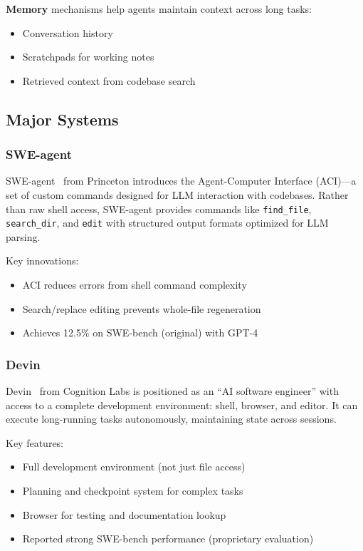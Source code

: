\textbf{Memory} mechanisms help agents maintain context across long tasks:
\begin{itemize}
    \item Conversation history
    \item Scratchpads for working notes
    \item Retrieved context from codebase search
\end{itemize}

\subsection{Major Systems}

\subsubsection{SWE-agent}

SWE-agent~\citep{yang2024sweagent} from Princeton introduces the Agent-Computer Interface (ACI)---a set of custom commands designed for LLM interaction with codebases. Rather than raw shell access, SWE-agent provides commands like \texttt{find\_file}, \texttt{search\_dir}, and \texttt{edit} with structured output formats optimized for LLM parsing.

Key innovations:
\begin{itemize}
    \item ACI reduces errors from shell command complexity
    \item Search/replace editing prevents whole-file regeneration
    \item Achieves 12.5\% on SWE-bench (original) with GPT-4
\end{itemize}

\subsubsection{Devin}

Devin~\citep{cognition2024devin} from Cognition Labs is positioned as an ``AI software engineer'' with access to a complete development environment: shell, browser, and editor. It can execute long-running tasks autonomously, maintaining state across sessions.

Key features:
\begin{itemize}
    \item Full development environment (not just file access)
    \item Planning and checkpoint system for complex tasks
    \item Browser for testing and documentation lookup
    \item Reported strong SWE-bench performance (proprietary evaluation)
\end{itemize}

